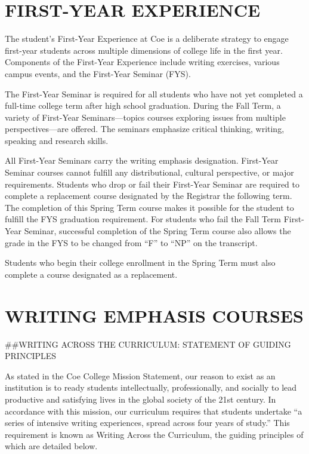 \documentclass[
  letterpaper,
]{scrbook}
\begin{document}
\chapter{FIRST-YEAR EXPERIENCE}\label{sec-first-year-experience}

The student's First-Year Experience at Coe is a deliberate strategy to
engage first-year students across multiple dimensions of college life in
the first year. Components of the First-Year Experience include writing
exercises, various campus events, and the First-Year Seminar (FYS).

The First-Year Seminar is required for all students who have not yet
completed a full-time college term after high school graduation. During
the Fall Term, a variety of First-Year Seminars---topics courses
exploring issues from multiple perspectives---are offered. The seminars
emphasize critical thinking, writing, speaking and research skills.

All First-Year Seminars carry the writing emphasis designation.
First-Year Seminar courses cannot fulfill any distributional, cultural
perspective, or major requirements. Students who drop or fail their
First-Year Seminar are required to complete a replacement course
designated by the Registrar the following term. The completion of this
Spring Term course makes it possible for the student to fulfill the FYS
graduation requirement. For students who fail the Fall Term First-Year
Seminar, successful completion of the Spring Term course also allows the
grade in the FYS to be changed from ``F'' to ``NP'' on the transcript.

Students who begin their college enrollment in the Spring Term must also
complete a course designated as a replacement.

\chapter{WRITING EMPHASIS COURSES}\label{sec-writing-emphasis-courses}

\#\#WRITING ACROSS THE CURRICULUM: STATEMENT OF GUIDING PRINCIPLES

As stated in the Coe College Mission Statement, our reason to exist as
an institution is to ready students intellectually, professionally, and
socially to lead productive and satisfying lives in the global society
of the 21st century. In accordance with this mission, our curriculum
requires that students undertake ``a series of intensive writing
experiences, spread across four years of study.'' This requirement is
known as Writing Across the Curriculum, the guiding principles of which
are detailed below.
\end{document}
